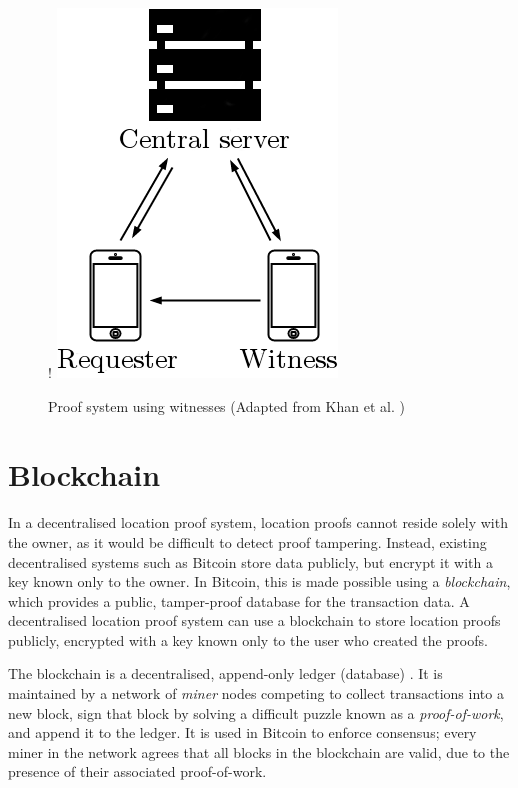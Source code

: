 \begin{figure}[H]
\begin{center}
 {!} {\includegraphics{diagrams/witness_paper.png}}
\caption{Proof system using witnesses (Adapted from Khan et al. \cite{khan})}
\label{fig:witness_paper}
\end{center}
\end{figure}

\section{Blockchain}
In a decentralised location proof system, location proofs cannot reside solely with the owner, as it would be difficult to detect proof tampering. Instead, existing decentralised systems such as Bitcoin \cite{bitcoin} store data publicly, but encrypt it with a key known only to the owner. In Bitcoin, this is made possible using a \textit{blockchain}, which provides a public, tamper-proof database for the transaction data. A decentralised location proof system can use a blockchain to store location proofs publicly, encrypted with a key known only to the user who created the proofs.

The blockchain is a decentralised, append-only ledger (database) \cite{blueprint}. It is maintained by a network of \textit{miner} nodes competing to collect transactions into a new block, sign that block by solving a difficult puzzle known as a \textit{proof-of-work}, and append it to the ledger. It is used in Bitcoin to enforce consensus; every miner in the network agrees that all blocks in the blockchain are valid, due to the presence of their associated proof-of-work.


